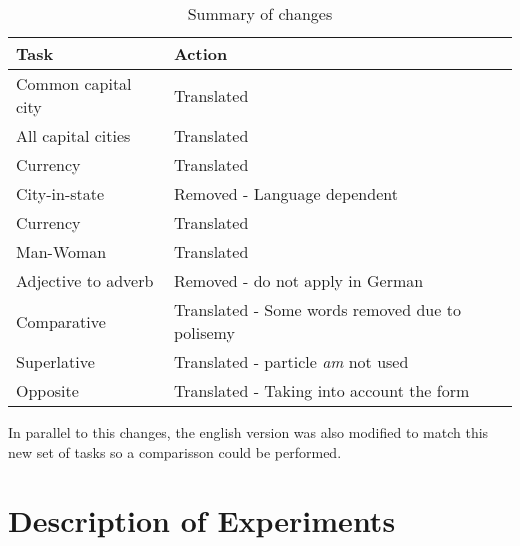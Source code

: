 \begin{table}[h]
   \caption{Summary of changes } 
   \label{tab:summary_of_changes_task}

   \begin{tabular}{ |l|l|  }

   \hline           
   Task  & Action   \\  \hline           
   Common capital city & Translated \\
   All capital cities  & Translated \\
   Currency & Translated  \\ 
   City-in-state   &  Removed - Language dependent \\
   Currency & Translated  \\
   Man-Woman  & Translated  \\
   Adjective to adverb  &  Removed - do not apply in German \\
   Comparative & Translated - Some words removed due to polisemy \\ 
   Superlative & Translated - particle \textit{am} not used \\
   Opposite  & Translated - Taking into account the form\\
   
   
\hline


  
 \end{tabular}
 \end{table}
  
    
  
In parallel to this changes, the english version was also modified to match
this new set of tasks so a comparisson could be performed.

\section{Description of Experiments}
\label{sec:german_eng_experiments}








